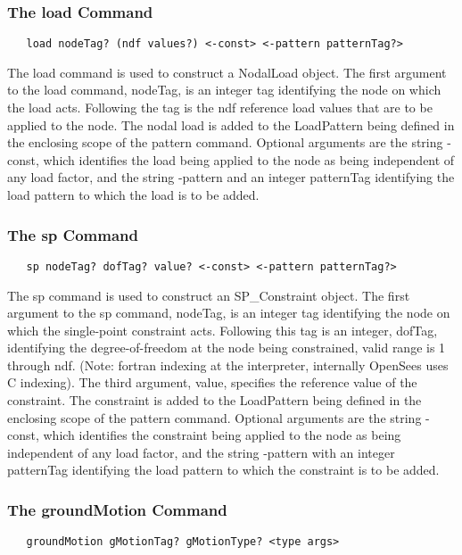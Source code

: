 \documentclass[12pt]{article}
\begin{document}
\subsubsection{The load Command}
{\sf\small
\begin{verbatim}
   load nodeTag? (ndf values?) <-const> <-pattern patternTag?>
\end{verbatim}
}

The load command is used to construct a NodalLoad object. The first
argument to the load command, nodeTag, is an integer tag identifying the
node on which the load acts. Following the tag is the ndf reference
load values that are to be applied to the node. The nodal load is
added to the LoadPattern being defined in the enclosing scope of the
pattern command. Optional arguments are the string -const, which
identifies the load being applied to the node as being independent of
any load factor, and the string -pattern and an integer patternTag
identifying the load pattern to which the load is to be added.

\subsubsection{The sp Command}
{\sf\small
\begin{verbatim}
   sp nodeTag? dofTag? value? <-const> <-pattern patternTag?>
\end{verbatim}
}

The sp command is used to construct an SP\_Constraint object. The first
argument to the sp command, nodeTag, is an integer tag identifying the
node on which the single-point constraint acts. Following this tag is 
an integer, dofTag, identifying the degree-of-freedom at the node being
constrained, valid range is 1 through ndf. (Note: fortran indexing at
the interpreter, internally OpenSees uses C indexing). The third argument,
value, specifies the reference value of the constraint. The constraint is
added to the LoadPattern being defined in the enclosing scope of the
pattern command. Optional arguments are the string -const, which
identifies the constraint being applied to the node as being independent of
any load factor, and the string -pattern with an integer patternTag
identifying the load pattern to which the constraint is to be added.


\subsubsection{The groundMotion Command}
{\sf\small
\begin{verbatim}
   groundMotion gMotionTag? gMotionType? <type args>
\end{verbatim}
}
\end{document}
